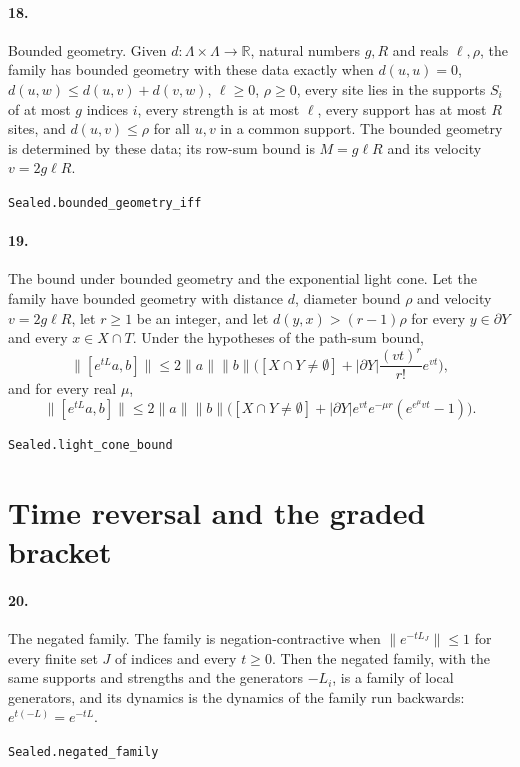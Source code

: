 \documentclass[11pt]{article}
\begin{document}
\paragraph{18.} Bounded geometry. Given $d : \Lambda \times \Lambda \to \mathbb R$, natural numbers $g, R$ and reals $\ell, \rho$, the family has bounded geometry with these data exactly when $d(u, u) = 0$, $d(u, w) \le d(u, v) + d(v, w)$, $\ell \ge 0$, $\rho \ge 0$, every site lies in the supports $S_i$ of at most $g$ indices $i$, every strength is at most $\ell$, every support has at most $R$ sites, and $d(u, v) \le \rho$ for all $u, v$ in a common support. The bounded geometry is determined by these data; its row-sum bound is $M = g \ell R$ and its velocity $v = 2 g \ell R$.\par{\footnotesize\texttt{Sealed.bounded\_geometry\_iff}}

\paragraph{19.} The bound under bounded geometry and the exponential light cone. Let the family have bounded geometry with distance $d$, diameter bound $\rho$ and velocity $v = 2 g \ell R$, let $r \ge 1$ be an integer, and let $d(y, x) > (r - 1)\rho$ for every $y \in \partial Y$ and every $x \in X \cap T$. Under the hypotheses of the path-sum bound, \[\|[e^{tL} a, b]\| \le 2\|a\|\|b\| \bigl([X \cap Y \ne \emptyset] + |\partial Y| \frac{(vt)^r}{r!} e^{vt}\bigr),\] and for every real $\mu$, \[\|[e^{tL} a, b]\| \le 2\|a\|\|b\| \bigl([X \cap Y \ne \emptyset] + |\partial Y| e^{vt} e^{-\mu r} (e^{e^{\mu} v t} - 1)\bigr).\]\par{\footnotesize\texttt{Sealed.light\_cone\_bound}}

\section*{Time reversal and the graded bracket}
\paragraph{20.} The negated family. The family is negation-contractive when $\|e^{-t L_J}\| \le 1$ for every finite set $J$ of indices and every $t \ge 0$. Then the negated family, with the same supports and strengths and the generators $-L_i$, is a family of local generators, and its dynamics is the dynamics of the family run backwards: $e^{t(-L)} = e^{-tL}$.\par{\footnotesize\texttt{Sealed.negated\_family}}
\end{document}
